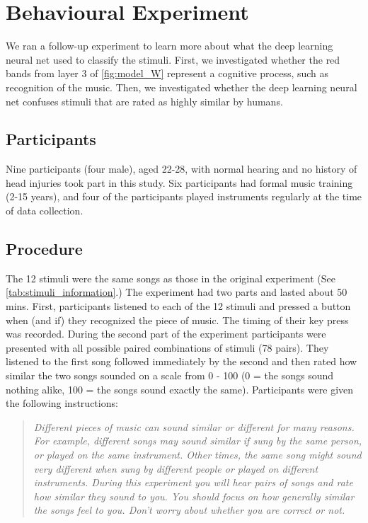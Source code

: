 \chapter{Behavioural Experiment}
We ran a follow-up experiment to learn more about what the deep learning neural net used to classify the stimuli. 
First, we investigated whether the red bands from layer 3 of \autoref{fig:model_W} represent a cognitive process, such as recognition of the music. 
Then, we investigated whether the deep learning neural net confuses stimuli that are rated as highly similar by humans.
\section{Participants}
Nine participants (four male), aged 22-28, with normal hearing and no history of head injuries took part in this study. 
Six participants had formal music training (2-15 years), and four of the participants played instruments regularly at the time of data collection. 
\section{Procedure}
The 12 stimuli were the same songs as those in the original experiment (See \autoref{tab:stimuli_information}.)
The experiment had two parts and lasted about 50 mins.
First, participants listened to each of the 12 stimuli and pressed a button when (and if) they recognized the piece of music.
The timing of their key press was recorded. 
During the second part of the experiment participants were presented with all possible paired combinations of stimuli (78 pairs). 
They listened to the first song followed immediately by the second and then rated how similar the two songs sounded on a scale from 0 - 100 (0 = the songs sound nothing alike, 100 = the songs sound exactly the same).
Participants were given the following instructions:
\begin{quote}\textit{
Different pieces of music can sound similar or different for many reasons.
For example, different songs may sound similar if sung by the same person, or played on the same instrument.
Other times, the same song might sound very different when sung by different people or played on different instruments.
During this experiment you will hear pairs of songs and rate how similar they sound to you.
You should focus on how generally similar the songs feel to you. Don't worry about whether you are correct or not.}
\end{quote}

